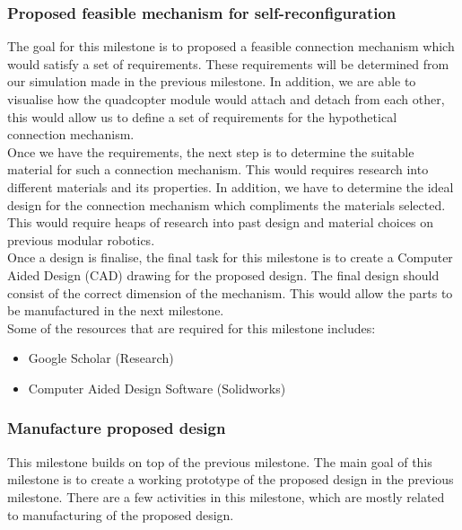 \documentclass[12pt,A4]{article}
\begin{document}
	\subsubsection{Proposed feasible mechanism for self-reconfiguration}
	
	The goal for this milestone is to proposed a feasible connection mechanism which would satisfy a set of requirements. These requirements will be determined from our simulation made in the previous milestone. In addition, we are able to visualise how the quadcopter module would attach and detach from each other, this would allow us to define a set of requirements for the hypothetical connection mechanism.\\
	
	Once we have the requirements, the next step is to determine the suitable material for such a connection mechanism. This would requires research into different materials and its properties. In addition, we have to determine the ideal design for the connection mechanism which compliments the materials selected. This would require heaps of research into past design and material choices on previous modular robotics.\\
	
	Once a design is finalise, the final task for this milestone is to create a Computer Aided Design (CAD) drawing for the proposed design. The final design should consist of the correct dimension of the mechanism. This would allow the parts to be manufactured in the next milestone.\\
	
	Some of the resources that are required for this milestone includes:
	\begin{itemize}
		\item Google Scholar (Research)
		\item Computer Aided Design Software (Solidworks)
	\end{itemize}
	
	\subsubsection{Manufacture proposed design}
	
	This milestone builds on top of the previous milestone. The main goal of this milestone is to create a working prototype of the proposed design in the previous milestone. There are a few activities in this milestone, which are mostly related to manufacturing of the proposed design.\\
	
\end{document}
